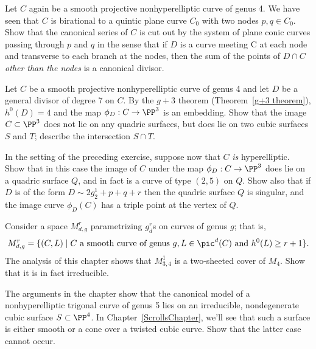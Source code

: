 \begin{exercise}\label{ex7.2}
Let $C$ again be a smooth projective nonhyperelliptic curve of genus 4. We have seen that $C$ is birational to a quintic plane curve $C_0$ with two nodes $p, q \in C_0$. Show that the canonical series of $C$ is cut out by the system of plane conic curves passing through $p$ and $q$ in the sense
that if $D$ is a curve meeting C at each node and transverse to each branch at the nodes, then
the sum of the points of $D\cap C$ \emph{other than the nodes} is a canonical divisor.
\end{exercise}

\begin{exercise}\label{ex7.3}
Let $C$  be a smooth projective nonhyperelliptic curve of genus 4 and let $D$ be a general divisor of degree 7 on $C$. By the $g+3$ theorem (Theorem~\ref{g+3 theorem}), $h^0(D) = 4$ and the map $\phi_D : C \to \PP^3$ is an embedding. Show that the image $C \subset \PP^3$ does not lie on any quadric surfaces, but does lie on two cubic surfaces $S$ and $T$; describe the intersection $S \cap T$.
\end{exercise}

\begin{exercise}\label{ex7.4}
In the setting of the preceding exercise, suppose now that $C$ \emph{is} hyperelliptic. Show that in this case the image of $C$ under the map $\phi_D : C \to \PP^3$ does lie on a quadric surface $Q$, and in fact is a curve of type $(2,5)$ on $Q$. Show also that if $D$ is of the form $D \sim 2g^1_2 + p + q + r$ then the quadric surface $Q$ is singular, and the image curve $\phi_D(C)$ has a triple point at the vertex of $Q$.
 \end{exercise}

\begin{exercise}\label{ex7.5}
Consider a space $M^r_{d,g}$ parametrizing $g^r_d$s on curves of genus $g$; that is,
$$
M^r_{d,g} = \{ (C, L) \mid C \text{ a smooth curve of genus } g, L \in \pic^d(C) \text{ and } h^0(L) \geq r+1 \}.
$$
The analysis of this chapter shows that $M^1_{3,4}$ is a two-sheeted cover of $M_4$. Show that it is in fact irreducible.
\end{exercise}

\begin{exercise}\label{ex7.6}
The arguments in the chapter show that the canonical model of a nonhyperelliptic trigonal curve of genus 5 lies on an irreducible, nondegenerate cubic surface $S \subset \PP^4$. In Chapter~\ref{ScrollsChapter}, we'll see that such a surface is either smooth or a cone over a twisted cubic curve. Show that the latter case cannot occur. 
\end{exercise}

